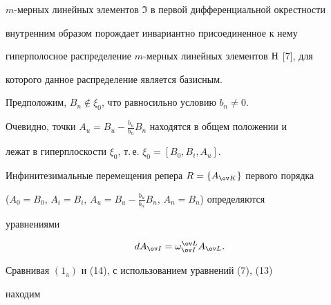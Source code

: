 $m$-мерных линейных элементов $\Im$ в первой дифференциальной окрестности 


внутренним образом порождает инвариантно присоединенное к нему 


гиперполосное распределение $m$-мерных линейных элементов $\mathrm H$ [7], для 


которого данное распределение является базисным. 


 


Предположим, $B_n\notin\xi_0$, что равносильно условию $b_n\ne0$. 


Очевидно, точки $A_u=B_u-\frac{b_u}{b_n}B_n$ находятся в общем положении и 


лежат в гиперплоскости $\xi_0$, т.\,е. $\xi_0=[B_0,B_i,A_u]$. 


 


Инфинитезимальные перемещения репера $R=\{A_{\ov K}\}$ первого порядка 


($A_0=B_0$, $A_i=B_i$, $A_u=B_u-\frac{b_u}{b_n}B_n$, $A_n=B_n$) определяются 


уравнениями 


\begin{equation} 


dA_{\ov I}=\omega^{\ov L}_{\ov I}A_{\ov L}. 


\end{equation} 


 


Сравнивая $(1_{\mathrm a})$ и (14), с использованием уравнений (7), (13) 


находим 


